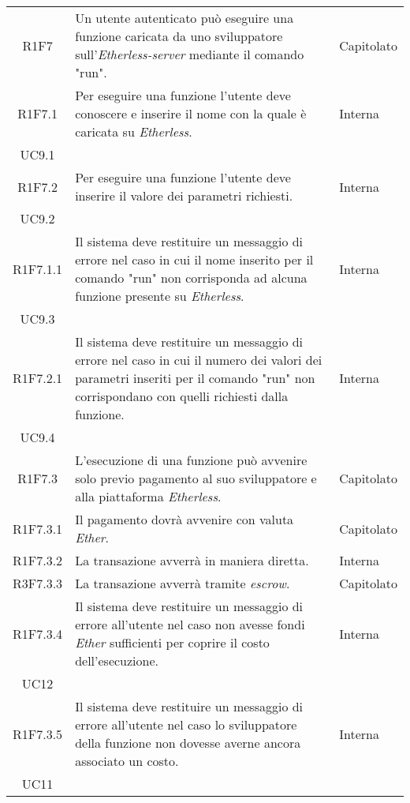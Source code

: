 \begin{longtable}{|c|p{8cm}|C{2cm}|}
	R1F7 &  Un utente autenticato può eseguire una funzione caricata da uno sviluppatore sull'\textit{Etherless-server} mediante il comando "run".  & Capitolato \\
	
	R1F7.1 &  Per eseguire una funzione l'utente deve conoscere e inserire il nome con la quale è caricata su \textit{Etherless}.  & \centering Interna \\ UC9.1 \tabularnewline
	
	R1F7.2 &  Per eseguire una funzione l'utente deve inserire il valore dei parametri richiesti.  & \centering Interna \\ UC9.2 \tabularnewline

	R1F7.1.1 &  Il sistema deve restituire un messaggio di errore nel caso in cui il nome inserito per il comando "run" non corrisponda ad alcuna funzione presente su \textit{Etherless}.  & \centering Interna \\ UC9.3 \tabularnewline
	
	R1F7.2.1 &  Il sistema deve restituire un messaggio di errore nel caso in cui il numero dei valori dei parametri inseriti per il comando "run" non corrispondano con quelli richiesti dalla funzione.  & \centering Interna \\ UC9.4 \tabularnewline
		
	R1F7.3 &  L'esecuzione di una funzione può avvenire solo previo pagamento al suo sviluppatore e alla piattaforma \textit{Etherless}. & Capitolato \\
	
	R1F7.3.1 &  Il pagamento dovrà avvenire con valuta \textit{Ether\glos}. & Capitolato \\
	
	R1F7.3.2 &  La transazione avverrà in maniera diretta. & Interna \\
	
	R3F7.3.3 &  La transazione avverrà tramite \textit{escrow\glos}. & Capitolato \\
	
	R1F7.3.4 &  Il sistema deve restituire un messaggio di errore all'utente nel caso non avesse fondi  \textit{Ether\glos} sufficienti per coprire il costo dell'esecuzione. & \centering Interna \\ UC12 \tabularnewline
	
	R1F7.3.5 &  Il sistema deve restituire un messaggio di errore all'utente nel caso lo sviluppatore della funzione non dovesse averne ancora associato un costo. & \centering Interna \\ UC11 \tabularnewline
	

\end{longtable}
